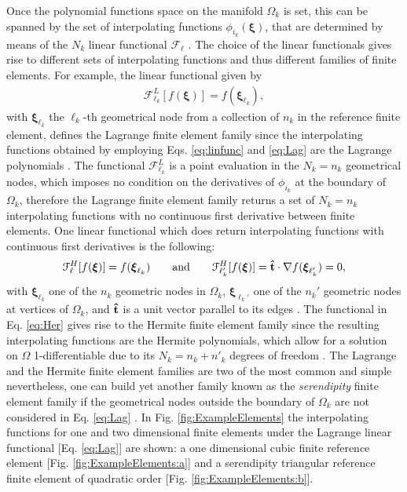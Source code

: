 Once the polynomial functions space on the manifold $\Omega_k$ is set, this can be spanned by the set of interpolating functions $\phi_{i_k}(\boldsymbol{\xi})$, that are determined by means of the $N_k$ linear functional  $\mathcal{F}_\ell$ \cite{larson_finite_2013}.   The choice of the  linear functionals gives rise to different sets of interpolating functions and thus different families of finite elements. For example, the linear functional given by
\begin{align}
 \mathcal{F}^{L}_{\ell_k}[f(\boldsymbol{\xi})] = f(\boldsymbol{\xi}_{\ell_k}) ,
\label{eq:Lag}
\end{align}
%
with  $\boldsymbol{\xi}_{\ell_k}$ the $\ell_k$-th  geometrical node from a collection of $n_k$ in the reference finite element, defines the Lagrange finite element family since the  interpolating functions obtained by employing Eqs. \eqref{eq:linfunc} and \eqref{eq:Lag} are the Lagrange polynomials \cite{larson_finite_2013,dhatt_finite_2012,fletcher_computational_1984}. The functional $\mathcal{F}^{L}_{\ell_k}$ is a point evaluation in the $N_k = n_k$  geometrical nodes, which imposes no condition on the derivatives of $\phi_{i_k}$ at the boundary of $\Omega_k$, therefore the Lagrange finite element family returns a set of $N_k = n_k$ interpolating functions with no continuous first derivative between finite elements. One linear functional which does return interpolating functions with continuous first derivatives is the following:
%
%
%
\begin{align}
     \mathcal{F}^{H}_\ell[f(\boldsymbol{\xi})] = f(\boldsymbol{\xi}_{\ell_k}) 
     \qquad
     \text{and}
     \qquad
     \mathcal{F}^{H}_{\ell_k'}[f(\boldsymbol{\xi})] = \vu{t}\cdot\nabla  f(\boldsymbol{\xi}_{\ell_k'}) = 0,
\label{eq:Her}
\end{align}
%
with $\boldsymbol{\xi}_{\ell_k}$ one of the $n_k$ geometric nodes in $\Omega_k$, $\boldsymbol{\xi}_{\ell_k'}$ one of the $n_k'$  geometric nodes at vertices of $\Omega_k$, and $\vu{t}$ is a unit vector parallel to its edges \cite{larson_finite_2013}. The functional in Eq. \eqref{eq:Her} gives rise to the Hermite finite element family since the resulting interpolating functions are the Hermite polynomials, which allow for a solution on $\Omega$ 1-differentiable due to its $N_k = n_k +  n'_k$ degrees of freedom \cite{dhatt_finite_2012,larson_finite_2013}. The Lagrange and the Hermite finite element families are two of the most common and simple nevertheless, one can build yet another family known as the \textit{serendipity} finite element family  if the geometrical nodes outside the boundary of $\Omega_k$ are not considered in Eq. \eqref{eq:Lag} \cite{fletcher_computational_1984}. In Fig. \ref{fig:ExampleElements} the interpolating functions for one and two dimensional finite elements under the Lagrange linear functional [Eq. \eqref{eq:Lag}] are shown:  a one dimensional cubic finite reference element [Fig. \ref{fig:ExampleElements:a}] and a serendipity triangular reference finite element of quadratic order [Fig. \ref{fig:ExampleElements:b}].

